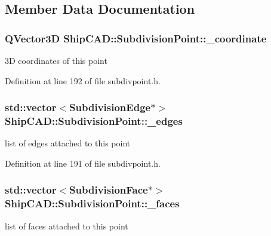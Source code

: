 \subsection{Member Data Documentation}
\hypertarget{classShipCAD_1_1SubdivisionPoint_a42bb8f729c7d79e594bda17f92ddb26b}{
\subsubsection[{\-\_\-coordinate}]{\setlength{\rightskip}{0pt plus 5cm}Q\-Vector3\-D Ship\-C\-A\-D\-::\-Subdivision\-Point\-::\-\_\-coordinate\hspace{0.3cm}{\ttfamily [protected]}}}\label{classShipCAD_1_1SubdivisionPoint_a42bb8f729c7d79e594bda17f92ddb26b}
3\-D coordinates of this point 

Definition at line 192 of file subdivpoint.\-h.

\hypertarget{classShipCAD_1_1SubdivisionPoint_a17c5a46dc6c130259e96f49719ef3ee9}{
\subsubsection[{\-\_\-edges}]{\setlength{\rightskip}{0pt plus 5cm}std\-::vector$<${\bf Subdivision\-Edge}$\ast$$>$ Ship\-C\-A\-D\-::\-Subdivision\-Point\-::\-\_\-edges\hspace{0.3cm}{\ttfamily [protected]}}}\label{classShipCAD_1_1SubdivisionPoint_a17c5a46dc6c130259e96f49719ef3ee9}
list of edges attached to this point 

Definition at line 191 of file subdivpoint.\-h.

\hypertarget{classShipCAD_1_1SubdivisionPoint_ace13688b5e2ad09c8d3f37cc0eaaaa52}{
\subsubsection[{\-\_\-faces}]{\setlength{\rightskip}{0pt plus 5cm}std\-::vector$<${\bf Subdivision\-Face}$\ast$$>$ Ship\-C\-A\-D\-::\-Subdivision\-Point\-::\-\_\-faces\hspace{0.3cm}{\ttfamily [protected]}}}\label{classShipCAD_1_1SubdivisionPoint_ace13688b5e2ad09c8d3f37cc0eaaaa52}
list of faces attached to this point 

